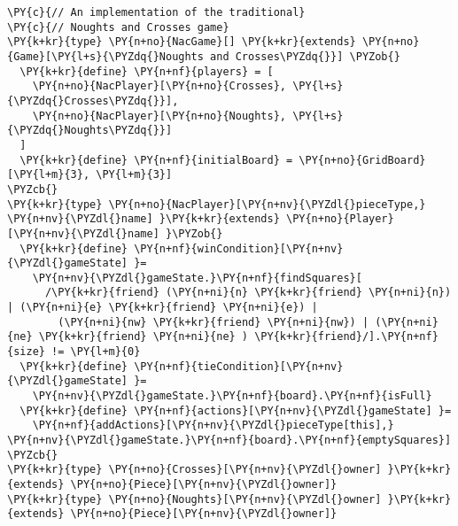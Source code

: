\begin{Verbatim}[commandchars=\\\{\}]
\PY{c}{// An implementation of the traditional}
\PY{c}{// Noughts and Crosses game}
\PY{k+kr}{type} \PY{n+no}{NacGame}[] \PY{k+kr}{extends} \PY{n+no}{Game}[\PY{l+s}{\PYZdq{}Noughts and Crosses\PYZdq{}}] \PYZob{}
  \PY{k+kr}{define} \PY{n+nf}{players} = [
    \PY{n+no}{NacPlayer}[\PY{n+no}{Crosses}, \PY{l+s}{\PYZdq{}Crosses\PYZdq{}}],
    \PY{n+no}{NacPlayer}[\PY{n+no}{Noughts}, \PY{l+s}{\PYZdq{}Noughts\PYZdq{}}]
  ]
  \PY{k+kr}{define} \PY{n+nf}{initialBoard} = \PY{n+no}{GridBoard}[\PY{l+m}{3}, \PY{l+m}{3}]
\PYZcb{}
\PY{k+kr}{type} \PY{n+no}{NacPlayer}[\PY{n+nv}{\PYZdl{}pieceType,} \PY{n+nv}{\PYZdl{}name] }\PY{k+kr}{extends} \PY{n+no}{Player}[\PY{n+nv}{\PYZdl{}name] }\PYZob{}
  \PY{k+kr}{define} \PY{n+nf}{winCondition}[\PY{n+nv}{\PYZdl{}gameState] }=
    \PY{n+nv}{\PYZdl{}gameState.}\PY{n+nf}{findSquares}[
      /\PY{k+kr}{friend} (\PY{n+ni}{n} \PY{k+kr}{friend} \PY{n+ni}{n}) | (\PY{n+ni}{e} \PY{k+kr}{friend} \PY{n+ni}{e}) |
        (\PY{n+ni}{nw} \PY{k+kr}{friend} \PY{n+ni}{nw}) | (\PY{n+ni}{ne} \PY{k+kr}{friend} \PY{n+ni}{ne} ) \PY{k+kr}{friend}/].\PY{n+nf}{size} != \PY{l+m}{0}
  \PY{k+kr}{define} \PY{n+nf}{tieCondition}[\PY{n+nv}{\PYZdl{}gameState] }=
    \PY{n+nv}{\PYZdl{}gameState.}\PY{n+nf}{board}.\PY{n+nf}{isFull}
  \PY{k+kr}{define} \PY{n+nf}{actions}[\PY{n+nv}{\PYZdl{}gameState] }=
    \PY{n+nf}{addActions}[\PY{n+nv}{\PYZdl{}pieceType[this],} \PY{n+nv}{\PYZdl{}gameState.}\PY{n+nf}{board}.\PY{n+nf}{emptySquares}]
\PYZcb{}
\PY{k+kr}{type} \PY{n+no}{Crosses}[\PY{n+nv}{\PYZdl{}owner] }\PY{k+kr}{extends} \PY{n+no}{Piece}[\PY{n+nv}{\PYZdl{}owner]}
\PY{k+kr}{type} \PY{n+no}{Noughts}[\PY{n+nv}{\PYZdl{}owner] }\PY{k+kr}{extends} \PY{n+no}{Piece}[\PY{n+nv}{\PYZdl{}owner]}
\end{Verbatim}
